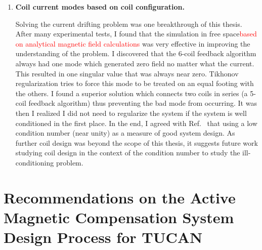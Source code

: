 \begin{enumerate}
\item {\bf Coil current modes based on coil configuration.}  

Solving the current drifting problem was one breakthrough of this thesis. After many experimental tests, I found that the simulation in free space\textcolor{red}{based on analytical magnetic field calculations} was very effective in improving the understanding of the problem. I discovered that the 6-coil feedback algorithm always had one mode which generated zero field no matter what the current. This resulted in one singular value that was always near zero. Tikhonov regularization tries to force this mode to be treated on an equal footing with the others. I found a superior solution which connects two coils in series (a 5-coil feedback algorithm) thus preventing the bad mode from occurring. It was then I realized I did not need to regularize the system if the system is well conditioned in the first place. In the end, I agreed with Ref.~\cite{rawlik} that using a low condition number (near unity) as a measure of good system design. As further coil design was beyond the scope of this thesis, it suggests future work studying coil design in the context of the condition number to study the ill-conditioning problem.

\end{enumerate}



\section{Recommendations on the Active Magnetic Compensation System Design Process for TUCAN}


